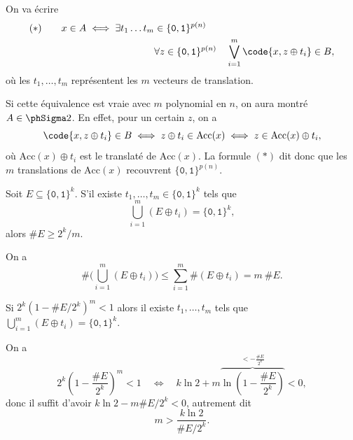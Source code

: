 \documentclass[./main]{subfiles}
\begin{document}
\begin{prv}
    On va écrire 
    \begin{align*}
      (*) \quad\quad
      x \in A \iff \exists t_1 \ldots t_m &\in \{\texttt{0},\texttt{1}\}^{p(n)}\\
      &\forall z \in \{\texttt{0},\texttt{1}\}^{p(n)} \quad \bigvee_{i=1}^m \code{x, z \oplus t_i} \in B
    ,\end{align*}
    où les $t_1,\ldots,t_m$ représentent les $m$ vecteurs de translation.

    Si cette équivalence est vraie avec $m$ polynomial en $n$, on aura montré $A \in \phSigma 2$.
    En effet, pour un certain $z$, on a
    \[
      \code{x,  z \oplus t_i} \in B \iff z \oplus t_i \in \mathrm{Acc}(x) \iff  z \in \mathrm{Acc}(x) \oplus t_i
    ,\]
    où $\mathrm{Acc}(x) \oplus t_i$ est le translaté de $\mathrm{Acc}(x)$.
    La formule $(*)$ dit donc que les $m$ translations de $\mathrm{Acc}(x)$ recouvrent $\{\texttt{0},\texttt{1}\}^{p(n)}$.

    \begin{lem}
      Soit $E \subseteq \{\texttt{0},\texttt{1}\}^k$.
      S'il existe $t_1, \ldots, t_m \in \{\texttt{0},\texttt{1}\}^k$ tels que
      \[
      \bigcup_{i=1}^m (E \oplus t_i) = \{\texttt{0},\texttt{1}\}^k
      ,\] 
      alors $\# E \ge 2^k / m$.
    \end{lem}
    \begin{prv}
      On a
      \[
        \# \Big(\bigcup_{i= 1}^m (E \oplus t_i)\Big) \le \sum_{i=1}^m \#(E \oplus t_i) = m \: \#E
      .\]
    \end{prv}

    \begin{lem}
      Si $2^k (1 - \# E / 2^k)^m < 1$ alors il existe  $t_1, \ldots, t_m$ tels que
      $\bigcup_{i=1}^m (E \oplus t_i) = \{\texttt{0},\texttt{1}\}^k$.
    \end{lem}
    \begin{rmk}
      On a
      \[
        2^k \left( 1 - \frac{\# E}{2^k} \right)^m < 1 \quad\iff\quad k \ln 2 + m \overbrace{\ln \left( 1 - \frac{\#E}{2^k} \right) }^{< - \frac{\# E}{2^k}} < 0
      ,\]
      donc il suffit d'avoir $k \ln 2 - m \# E / 2^k < 0$, autrement dit
      \[
      m > \frac{k \ln 2}{\#E / 2^k}
      .\]
    \end{rmk}

    \vspace{12pt}


\end{prv}
\end{document}
